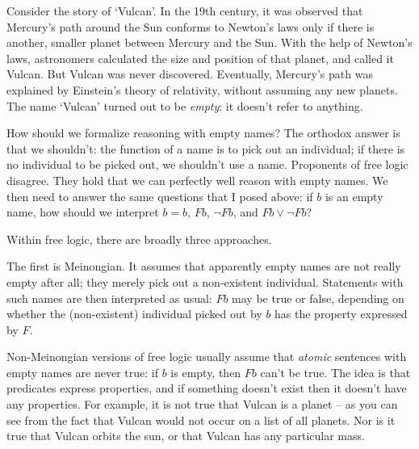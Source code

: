 Consider the story of `Vulcan'. In the 19th century, it was observed that
Mercury's path around the Sun conforms to Newton's laws only if there is
another, smaller planet between Mercury and the Sun. With the help of Newton's
laws, astronomers calculated the size and position of that planet, and called it
Vulcan. But Vulcan was never discovered. Eventually, Mercury's path was
explained by Einstein's theory of relativity, without assuming any new planets.
The name `Vulcan' turned out to be \emph{empty}: it doesn't refer to anything.


How should we formalize reasoning with empty names? The orthodox answer is that
we shouldn't: the function of a name is to pick out an individual; if there is
no individual to be picked out, we shouldn't use a name. Proponents of free
logic disagree. They hold that we can perfectly well reason with empty names. We
then need to answer the same questions that I posed above: if $b$ is an empty
name, how should we interpret $b=b$, $Fb$, $\neg Fb$, and $Fb \lor \neg Fb$?

Within free logic, there are broadly three approaches.

The first is Meinongian. It assumes that apparently empty names are not really
empty after all; they merely pick out a non-existent individual. Statements with
such names are then interpreted as usual: $Fb$ may be true or false, depending
on whether the (non-existent) individual picked out by $b$ has the property
expressed by $F$.

Non-Meinongian versions of free logic usually assume that \emph{atomic}
sentences with empty names are never true: if $b$ is empty, then $Fb$ can't be
true. The idea is that predicates express properties, and if something doesn't
exist then it doesn't have any properties. For example, it is not true that
Vulcan is a planet -- as you can see from the fact that Vulcan would not occur
on a list of all planets. Nor is it true that Vulcan orbits the sun, or that
Vulcan has any particular mass.


